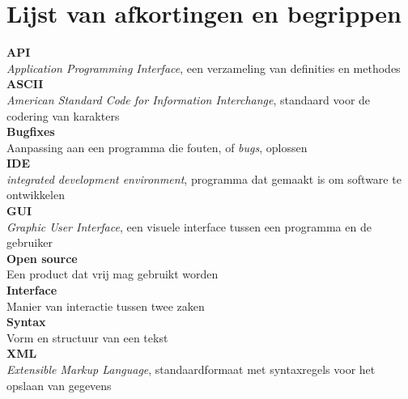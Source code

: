 \chapter*{Lijst van afkortingen en begrippen}

\textbf{API}
\\ 
\textit{Application Programming Interface}, een verzameling van definities en methodes
\\
\textbf{ASCII}
\\ 
\textit{American Standard Code for Information Interchange}, standaard voor de codering van karakters
\\
\textbf{Bugfixes}
\\ 
Aanpassing aan een programma die fouten, of \textit{bugs}, oplossen 
\\
\textbf{IDE}
\\ 
\textit{integrated development environment}, programma dat gemaakt is om software te ontwikkelen
\\
\textbf{GUI} 
\\ 
\textit{Graphic User Interface}, een visuele interface tussen een programma en de gebruiker
\\
\textbf{Open source}
\\ 
Een product dat vrij mag gebruikt worden
\\
\textbf{Interface} 
\\ 
Manier van interactie tussen twee zaken
\\
\textbf{Syntax}
\\ 	
Vorm en structuur van een tekst
\\
\textbf{XML} 
\\
\textit{Extensible Markup Language}, standaardformaat met syntaxregels voor het opslaan van gegevens